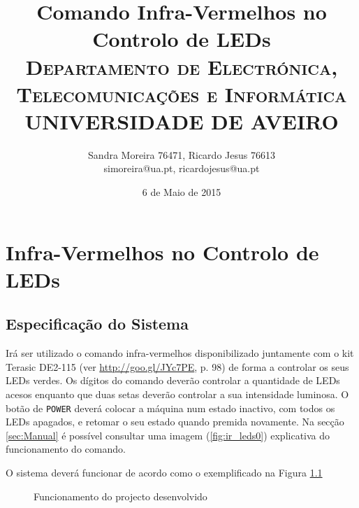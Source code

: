 \documentclass[a4paper,11pt,openright,oneside]{report}
\begin{document}
\title{\textbf{Comando Infra-Vermelhos no Controlo de LEDs}\\[1cm]\textsc{\small {Departamento de Electrónica, Telecomunicações e Informática} \\ \large {UNIVERSIDADE DE AVEIRO}}}
\author{Sandra Moreira 76471, Ricardo Jesus 76613\\simoreira@ua.pt, ricardojesus@ua.pt}
\date{6 de Maio de 2015}
\maketitle
{}

\chapter{Infra-Vermelhos no Controlo de LEDs}

\section{Especificação do Sistema}
\label{sec:especificação}

Irá ser utilizado o comando infra-vermelhos disponibilizado juntamente com o kit Terasic DE2-115 (ver \url{http://goo.gl/JYc7PE}, p. 98) de forma a controlar os seus LEDs verdes. Os dígitos do comando deverão controlar a quantidade de LEDs acesos enquanto que duas setas deverão controlar a sua intensidade luminosa. O botão de \verb|POWER| deverá colocar a máquina num estado inactivo, com todos os LEDs apagados, e retomar o seu estado quando premida novamente. Na secção \ref{sec:Manual} é possível consultar uma imagem (\ref{fig:ir_leds0}) explicativa do funcionamento do comando. 

O sistema deverá funcionar de acordo como o exemplificado na Figura \ref{fig:ir_leds1}

\begin{figure}[ht]
\center
{}
\caption{Funcionamento do projecto desenvolvido}
\label{fig:ir_leds1}
\end{figure}
\end{document}
